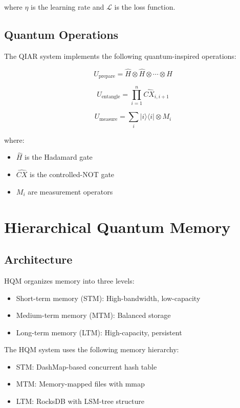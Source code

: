 \documentclass[10pt,twocolumn]{article}
\begin{document}
where $\eta$ is the learning rate and $\mathcal{L}$ is the loss function.

\subsection{Quantum Operations}
The QIAR system implements the following quantum-inspired operations:

\begin{equation}
    U_{\text{prepare}} = \hat{H} \otimes \hat{H} \otimes \cdots \otimes \hat{H}
\end{equation}

\begin{equation}
    U_{\text{entangle}} = \prod_{i=1}^n \hat{CX}_{i,i+1}
\end{equation}

\begin{equation}
    U_{\text{measure}} = \sum_i |i\rangle\langle i| \otimes M_i
\end{equation}

where:
\begin{itemize}
    \item $\hat{H}$ is the Hadamard gate
    \item $\hat{CX}$ is the controlled-NOT gate
    \item $M_i$ are measurement operators
\end{itemize}

\section{Hierarchical Quantum Memory}
\subsection{Architecture}
HQM organizes memory into three levels:
\begin{itemize}
    \item Short-term memory (STM): High-bandwidth, low-capacity
    \item Medium-term memory (MTM): Balanced storage
    \item Long-term memory (LTM): High-capacity, persistent
\end{itemize}

The HQM system uses the following memory hierarchy:
\begin{itemize}
    \item STM: DashMap-based concurrent hash table
    \item MTM: Memory-mapped files with mmap
    \item LTM: RocksDB with LSM-tree structure
\end{itemize}
\end{document}
